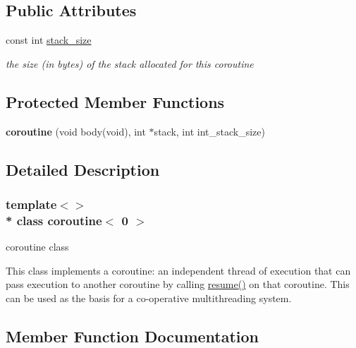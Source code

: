 \subsection*{Public Attributes}
\begin{DoxyCompactItemize}
\item 
const int \hyperlink{classcoroutine_3_010_01_4_a3a60f49f800cd809f30cb08d10791319}{stack\+\_\+size}\hypertarget{classcoroutine_3_010_01_4_a3a60f49f800cd809f30cb08d10791319}{}\label{classcoroutine_3_010_01_4_a3a60f49f800cd809f30cb08d10791319}

\begin{DoxyCompactList}\small\item\em the size (in bytes) of the stack allocated for this coroutine \end{DoxyCompactList}\end{DoxyCompactItemize}
\subsection*{Protected Member Functions}
\begin{DoxyCompactItemize}
\item 
{\bfseries coroutine} (void body(void), int $\ast$stack, int int\+\_\+stack\+\_\+size)\hypertarget{classcoroutine_3_010_01_4_a0b84949051013d4b0285ad61c22ed5b8}{}\label{classcoroutine_3_010_01_4_a0b84949051013d4b0285ad61c22ed5b8}

\end{DoxyCompactItemize}


\subsection{Detailed Description}
\subsubsection*{template$<$$>$\\*
class coroutine$<$ 0 $>$}

coroutine class 

This class implements a coroutine\+: an independent thread of execution that can pass execution to another coroutine by calling \hyperlink{classcoroutine_3_010_01_4_ab2afad14fd6145bc0588baec6b8bbe32}{resume()} on that coroutine. This can be used as the basis for a co-\/operative multithreading system. 

\subsection{Member Function Documentation}
